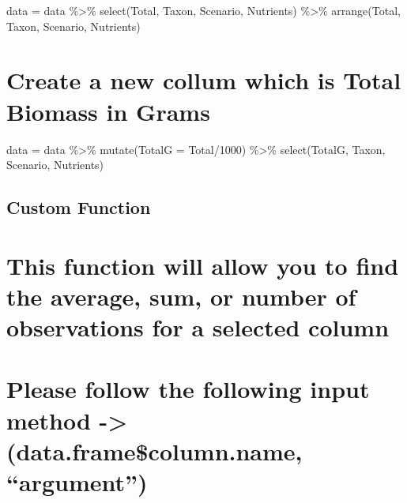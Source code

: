 \documentclass[
]{article}
\newenvironment{Shaded}{\begin{snugshade}}{\end{snugshade}}
\newcommand{\AttributeTok}[1]{\textcolor[rgb]{0.77,0.63,0.00}{#1}}
\newcommand{\DecValTok}[1]{\textcolor[rgb]{0.00,0.00,0.81}{#1}}
\newcommand{\FunctionTok}[1]{\textcolor[rgb]{0.00,0.00,0.00}{#1}}
\newcommand{\NormalTok}[1]{#1}
\newcommand{\OtherTok}[1]{\textcolor[rgb]{0.56,0.35,0.01}{#1}}
\newcommand{\SpecialCharTok}[1]{\textcolor[rgb]{0.00,0.00,0.00}{#1}}
\begin{document}
\begin{Shaded}
\begin{Highlighting}[]
\NormalTok{data }\OtherTok{=}\NormalTok{ data }\SpecialCharTok{\%\textgreater{}\%}
  \FunctionTok{select}\NormalTok{(Total, Taxon, Scenario, Nutrients) }\SpecialCharTok{\%\textgreater{}\%}
  \FunctionTok{arrange}\NormalTok{(Total, Taxon, Scenario, Nutrients)}
\end{Highlighting}
\end{Shaded}

\hypertarget{create-a-new-collum-which-is-total-biomass-in-grams}{%
\section{Create a new collum which is Total Biomass in
Grams}\label{create-a-new-collum-which-is-total-biomass-in-grams}}

\begin{Shaded}
\begin{Highlighting}[]
\NormalTok{data }\OtherTok{=}\NormalTok{ data }\SpecialCharTok{\%\textgreater{}\%}
  \FunctionTok{mutate}\NormalTok{(}\AttributeTok{TotalG =}\NormalTok{ Total}\SpecialCharTok{/}\DecValTok{1000}\NormalTok{) }\SpecialCharTok{\%\textgreater{}\%}
  \FunctionTok{select}\NormalTok{(TotalG, Taxon, Scenario, Nutrients)}
\end{Highlighting}
\end{Shaded}

\hypertarget{custom-function}{%
\subsection{Custom Function}\label{custom-function}}

\hypertarget{this-function-will-allow-you-to-find-the-average-sum-or-number-of-observations-for-a-selected-column}{%
\section{This function will allow you to find the average, sum, or
number of observations for a selected
column}\label{this-function-will-allow-you-to-find-the-average-sum-or-number-of-observations-for-a-selected-column}}

\hypertarget{please-follow-the-following-input-method---data.framecolumn.name-argument}{%
\section{Please follow the following input method -\textgreater{}
(data.frame\$column.name,
``argument'')}\label{please-follow-the-following-input-method---data.framecolumn.name-argument}}
\end{document}
